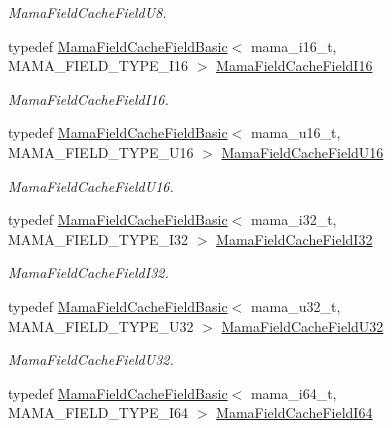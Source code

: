 \begin{DoxyCompactItemize}
\begin{DoxyCompactList}\small\item\em MamaFieldCacheFieldU8. \item\end{DoxyCompactList}\item 
typedef \hyperlink{classWombat_1_1MamaFieldCacheFieldBasic}{MamaFieldCacheFieldBasic}$<$ mama\_\-i16\_\-t, MAMA\_\-FIELD\_\-TYPE\_\-I16 $>$ \hyperlink{namespaceWombat_a208ee53b62b8b5c5581a6e42d57924ad}{MamaFieldCacheFieldI16}
\begin{DoxyCompactList}\small\item\em MamaFieldCacheFieldI16. \item\end{DoxyCompactList}\item 
typedef \hyperlink{classWombat_1_1MamaFieldCacheFieldBasic}{MamaFieldCacheFieldBasic}$<$ mama\_\-u16\_\-t, MAMA\_\-FIELD\_\-TYPE\_\-U16 $>$ \hyperlink{namespaceWombat_a16f910230b180a2fbf517c2f1ea89f6e}{MamaFieldCacheFieldU16}
\begin{DoxyCompactList}\small\item\em MamaFieldCacheFieldU16. \item\end{DoxyCompactList}\item 
typedef \hyperlink{classWombat_1_1MamaFieldCacheFieldBasic}{MamaFieldCacheFieldBasic}$<$ mama\_\-i32\_\-t, MAMA\_\-FIELD\_\-TYPE\_\-I32 $>$ \hyperlink{namespaceWombat_a35a470f6b3aefa2ef20ef594378094f7}{MamaFieldCacheFieldI32}
\begin{DoxyCompactList}\small\item\em MamaFieldCacheFieldI32. \item\end{DoxyCompactList}\item 
typedef \hyperlink{classWombat_1_1MamaFieldCacheFieldBasic}{MamaFieldCacheFieldBasic}$<$ mama\_\-u32\_\-t, MAMA\_\-FIELD\_\-TYPE\_\-U32 $>$ \hyperlink{namespaceWombat_a5af34a1565bbf22e343990ffaca469c2}{MamaFieldCacheFieldU32}
\begin{DoxyCompactList}\small\item\em MamaFieldCacheFieldU32. \item\end{DoxyCompactList}\item 
typedef \hyperlink{classWombat_1_1MamaFieldCacheFieldBasic}{MamaFieldCacheFieldBasic}$<$ mama\_\-i64\_\-t, MAMA\_\-FIELD\_\-TYPE\_\-I64 $>$ \hyperlink{namespaceWombat_a57de9ff30eb6422968703e327e83a2bb}{MamaFieldCacheFieldI64}

\end{DoxyCompactItemize}
